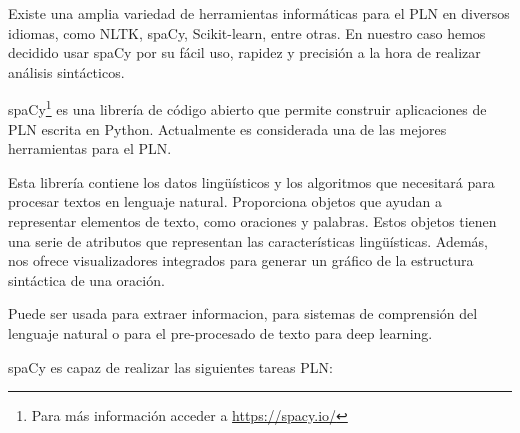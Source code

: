 Existe una amplia variedad de herramientas informáticas para el PLN en diversos idiomas, como NLTK, spaCy, Scikit-learn, entre otras. En nuestro caso hemos decidido usar spaCy por su fácil uso, rapidez y precisión a la hora de realizar análisis sintácticos.

spaCy\footnote{Para más información acceder a \href{https://spacy.io/}{https://spacy.io/}} es una librería de código abierto que permite construir aplicaciones de PLN escrita en Python. Actualmente es considerada una de las mejores herramientas para el PLN. 


Esta librería contiene los datos lingüísticos y los algoritmos que necesitará para procesar textos en lenguaje natural. Proporciona objetos que ayudan a representar elementos de texto, como oraciones y palabras. Estos objetos tienen una serie de atributos que representan las características lingüísticas. Además, nos ofrece visualizadores integrados para generar un gráfico de la estructura sintáctica de una oración.

Puede ser usada para extraer informacion, para sistemas de comprensión del lenguaje natural o para el pre-procesado de texto para deep learning.

spaCy es capaz de realizar las siguientes tareas PLN:

